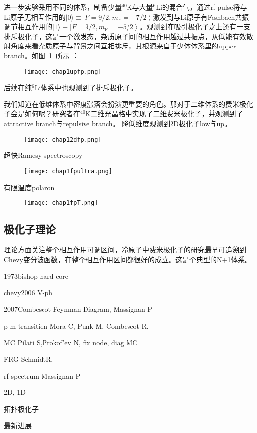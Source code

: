 进一步实验\cite{kohstall2012metastability}采用不同的体系，制备少量${}^{40}$K与大量${}^{6}$Li的混合气，通过rf pulse将与Li原子无相互作用的$|0\rangle\equiv\left|F=9 / 2, m_{\mathrm{F}}=-7 / 2\right\rangle$激发到与Li原子有Feshbach共振调节相互作用的$|1\rangle \equiv\left|F=9 / 2, m_{\mathrm{F}}=-5 / 2\right\rangle$。观测到在吸引极化子之上还有一支排斥极化子，这是一个激发态，杂质原子间的相互作用越过共振点，从低能有效散射角度来看杂质原子与背景之间互相排斥，其根源来自于少体体系里的upper branch。如图~\ref{upfp}~所示 ：
\begin{figure}[!htbp]
    \centering
    \texttt{[image: chap1upfp.png]}
    \label{upfp}
\end{figure}
后续在纯${}^{6}$Li体系中也观测到了排斥极化子\cite{Scazzarepulsive}。

我们知道在低维体系中密度涨落会扮演更重要的角色。那对于二维体系的费米极化子会是如何呢？研究者在${}^{40}$K二维光晶格中实现了二维费米极化子，并观测到了attractive branch与repulsive branch。
降低维度观测到2D极化子low与up\cite{koschorreck2012attractive}。
\begin{figure}[!htbp]
    \centering
    \texttt{[image: chap12dfp.png]}
    \label{2dfp}
\end{figure}

超快Ramesy spectroscopy
\begin{figure}[!htbp]
    \centering
    \texttt{[image: chap1fpultra.png]}
    \label{fpultra}
\end{figure}

有限温度polaron
\begin{figure}[!htbp]
    \centering
    \texttt{[image: chap1fpT.png]}
    \label{fpT}
\end{figure}




\subsection{极化子理论}
理论方面关注整个相互作用可调区间，冷原子中费米极化子的研究最早可追溯到Chevy变分波函数，在整个相互作用区间都很好的成立。这是个典型的N+1体系。

1973bishop hard core

chevy2006 V-ph

2007Combescot Feynman Diagram, Massignan P

p-m transition Mora C, Punk M, Combescot R.

MC Pilati S,Prokof’ev N, fix node, diag MC

FRG SchmidtR,

rf spectrum Massignan P

2D, 1D


拓扑极化子

最新进展














